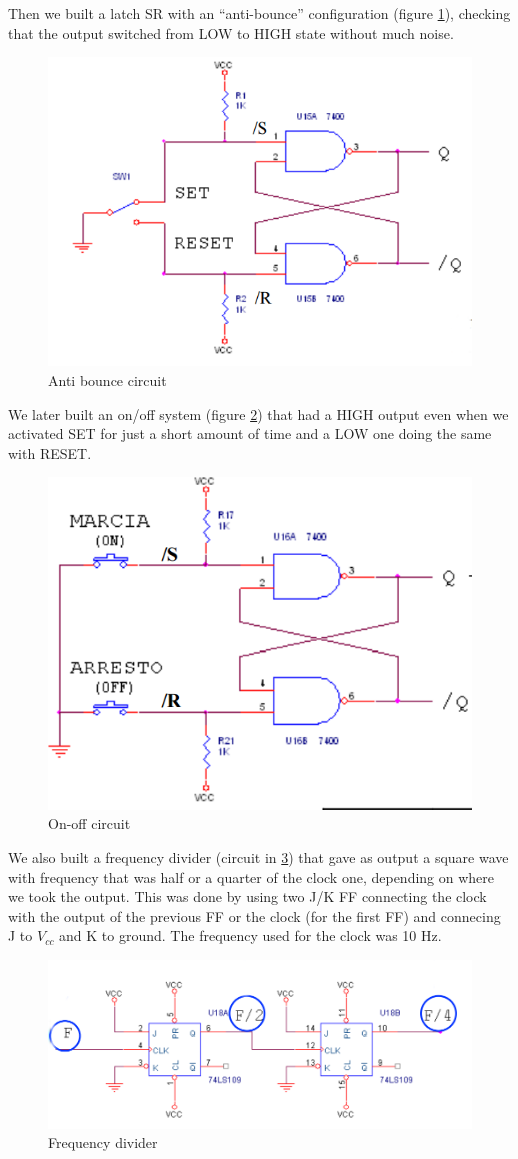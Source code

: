 Then we built a latch SR with an ``anti-bounce'' configuration (figure \ref{bounce}), checking that the output switched from LOW to HIGH state without much noise.
\begin{figure}[H]
\centering
\includegraphics[width=.7\textwidth]{11/bounce.png}
\caption{Anti bounce circuit}\label{bounce}
\end{figure}
We later built an on/off system (figure \ref{ON_OFF}) that had a HIGH output even when we activated SET for just a short amount of time and a LOW one doing the same with RESET.
\begin{figure}[H]
\centering
\includegraphics[width=.5\textwidth]{11/ON_OFF.png}
\caption{On-off circuit}\label{ON_OFF}
\end{figure}
We also built a frequency divider (circuit in \ref{f_div}) that gave as output a square wave with frequency that was half or a quarter of the clock one, depending on where we took the output. This was done by using two J/K FF connecting the clock with the output of the previous FF or the clock (for the first FF) and connecing J to $V_{cc}$ and K to ground. The frequency used for the clock was 10 Hz.
\begin{figure}[H]
\centering
\includegraphics[width=.7\textwidth]{11/f_div.png}
\caption{Frequency divider}\label{f_div}
\end{figure}
